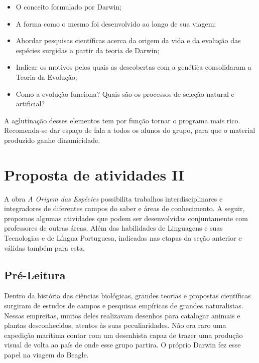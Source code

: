 \documentclass[12pt]{extarticle}
\begin{document}
\begin{itemize} \item O conceito formulado por Darwin; \item A forma como
    o mesmo foi desenvolvido ao longo de sua viagem; \item Abordar pesquisas
      científicas acerca da origem da vida e da evolução das espécies surgidas
      a partir da teoria de Darwin; \item Indicar os motivos pelos quais as
  descobertas com a genética consolidaram a Teoria da Evolução; \item Como
a evolução funciona? Quais são os processos de seleção natural e artificial?
\end{itemize}

A aglutinação desses elementos tem por função tornar o programa mais rico.
Recomenda-se dar espaço de fala a todos os alunos do grupo, para que o material
produzido ganhe dinamicidade.

\section{Proposta de atividades II}

A obra \emph{A Origem das Espécies} possibilita trabalhos interdisciplinares
e integradores de diferentes campos do saber e áreas de conhecimento. A seguir,
propomos algumas atividades que podem ser desenvolvidas conjuntamente com
professores de outras áreas. Além das habilidades de Linguagens e suas
Tecnologias e de Língua Portuguesa, indicadas nas etapas da seção anterior
e válidas também para esta,

\subsection{Pré-Leitura}

Dentro da história das ciências biológicas, grandes teorias e propostas
científicas surgiram de estudos de campos e pesquisas empíricas de grandes
naturalistas. Nessas empreitas, muitos deles realizavam desenhos para catalogar
animais e plantas desconhecidos, atentos às suas peculiaridades. Não era raro
uma expedição marítima contar com um desenhista capaz de trazer uma produção
visual de volta ao país de onde esse grupo partira. O próprio Darwin fez esse
papel na viagem do Beagle.




\end{document}
